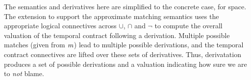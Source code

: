 The semantics and derivatives here are simplified to the concrete case, for space.
%
The extension to support the approximate matching semantics uses the appropriate logical connectives across $\cup$, $\cap$ and $\neg$ to compute the overall valuation of the temporal contract following a derivation.
%
Multiple possible matches (given from $\mathit{m}$) lead to multiple possible derivations, and the temporal contract connectives are lifted over these sets of derivatives.
%
Thus, derivatation produces a set of possible derivations and a valuation indicating how sure we are to \emph{not} blame.

\newcommand*{\matchsemfigs}[4]{
 \iftwocolumn{\begin{figure} #1 #2 \end{figure}
              \begin{figure} #3 #4 \end{figure}}
             {\begin{figure}
              \begin{minipage}[b]{.50\linewidth}#1 #2\hrule height 0pt\end{minipage}
              \begin{minipage}[b]{.45\linewidth}#3 #4\hrule height 0pt\end{minipage}
             \end{figure}}} 
